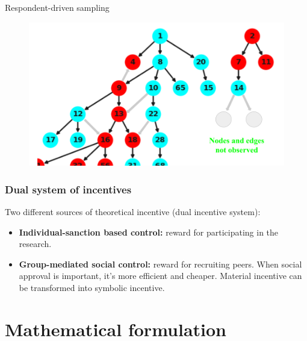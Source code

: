 \documentclass{beamer}
\newcommand{\Space}{\vspace{3ex}}
\begin{document}
\begin{frame}{Respondent-driven sampling}
\begin{figure}
\begin{overprint}
    \includegraphics[width=\textwidth]{../../images/graph-rds-harvard-4-english.png}
    \end{overprint}
  \end{figure}  
\end{frame}

\begin{frame}
  
  \frametitle{Dual system of incentives}
    
  Two different sources of theoretical incentive (dual incentive system):

  \Space

  \begin{itemize}
    \justifying
    \item<1> {\bf Individual-sanction based control:} reward for participating
    in the research. 

    \Space

    \item<2> {\bf Group-mediated social control:} reward for recruiting peers.
    When social approval is important, it's more efficient and cheaper.
    Material incentive can be transformed into symbolic incentive. 
  \end{itemize}

\end{frame}


\section{Mathematical formulation}
\end{document}
